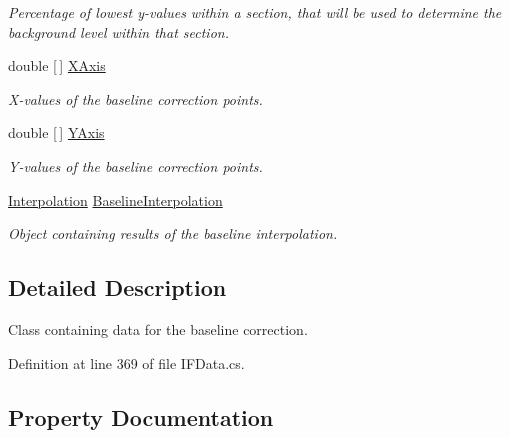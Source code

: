 \begin{DoxyCompactItemize}
\begin{DoxyCompactList}\small\item\em Percentage of lowest y-\/values within a section, that will be used to determine the background level within that section. \end{DoxyCompactList}\item 
double \mbox{[}$\,$\mbox{]} \hyperlink{class_isotope_fit_1_1_i_f_data_1_1_baseline_corr_a90e35ea8c62d07f0279f4b5f7d440491}{X\+Axis}
\begin{DoxyCompactList}\small\item\em X-\/values of the baseline correction points. \end{DoxyCompactList}\item 
double \mbox{[}$\,$\mbox{]} \hyperlink{class_isotope_fit_1_1_i_f_data_1_1_baseline_corr_aa71067f79827da27836daa705413133c}{Y\+Axis}
\begin{DoxyCompactList}\small\item\em Y-\/values of the baseline correction points. \end{DoxyCompactList}\item 
\hyperlink{class_isotope_fit_1_1_interpolation}{Interpolation} \hyperlink{class_isotope_fit_1_1_i_f_data_1_1_baseline_corr_a914a7b2ac945482a7c73874fbff45951}{Baseline\+Interpolation}
\begin{DoxyCompactList}\small\item\em Object containing results of the baseline interpolation. \end{DoxyCompactList}\end{DoxyCompactItemize}


\subsection{Detailed Description}
Class containing data for the baseline correction. 



Definition at line 369 of file I\+F\+Data.\+cs.



\subsection{Property Documentation}
\mbox{\label{class_isotope_fit_1_1_i_f_data_1_1_baseline_corr_a914a7b2ac945482a7c73874fbff45951}} 
